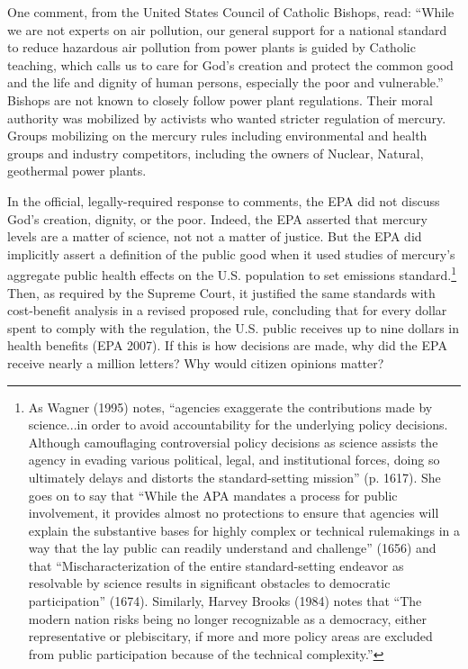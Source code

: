 One comment, from the United States Council of Catholic Bishops, read: ``While we are not experts on air pollution, our general support for a national standard to reduce hazardous air pollution from power plants is guided by Catholic teaching, which calls us to care for God’s creation and protect the common good and the life and dignity of human persons, especially the poor and vulnerable.'' Bishops are not known to closely follow power plant regulations. Their moral authority was mobilized by activists who wanted stricter regulation of mercury. Groups mobilizing on the mercury rules including environmental and health groups and industry competitors, including the owners of Nuclear, Natural, geothermal power plants. 

In the official, legally-required response to comments, the EPA did not discuss God's creation, dignity, or the poor.  Indeed, the EPA asserted that mercury levels are a matter of science, not not a matter of justice. But the EPA did implicitly assert a definition of the public good when it used studies of mercury's aggregate public health effects on the U.S. population to set emissions standard.\footnote{As Wagner (1995) %
notes, ``agencies exaggerate the contributions made by science...in order to avoid accountability for the underlying policy decisions. Although camouflaging controversial policy decisions as science assists the agency in evading various political, legal, and institutional forces, doing so ultimately delays and distorts the standard-setting mission'' (p. 1617). She goes on to say that  ``While the APA mandates a process for public involvement, it provides almost no protections to ensure that agencies will explain the substantive bases for highly complex or technical rulemakings in a way that the lay public can readily understand and challenge'' (1656) and that ``Mischaracterization of the entire standard-setting endeavor as resolvable by science results in significant obstacles to democratic participation'' (1674). Similarly, Harvey Brooks (1984) notes that ``The modern nation risks being no longer recognizable as a democracy, either representative or plebiscitary, if more and more policy areas are excluded from public participation because of the technical complexity.''} 
Then, as required by the Supreme Court, it justified the same standards with cost-benefit analysis in a revised proposed rule, concluding that for every dollar spent to comply with the regulation, the U.S. public receives up to nine dollars in health benefits (EPA 2007). If this is how decisions are made, why did the EPA receive nearly a million letters? Why would citizen opinions matter? 

